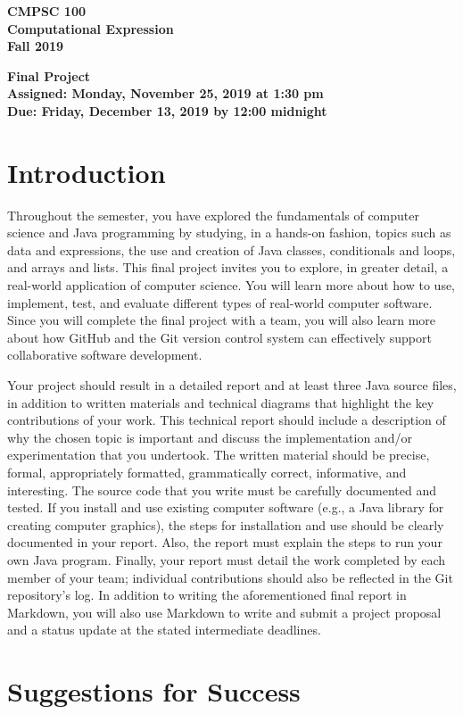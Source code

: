 \documentclass[11pt]{article}
\newcommand{\assignmentduedate}{December 13}
\newcommand{\assignmentassignedate}{November 25}
\newcommand{\labyear}{2019}
\newcommand{\labday}{Monday}
\newcommand{\labdueday}{Friday}
\newcommand{\labtime}{1:30 pm}
\newcommand{\labduetime}{12:00 midnight}
\newcommand{\assigneddate}{Assigned: \labday, \assignmentassignedate, \labyear{} at \labtime{}}
\newcommand{\duedate}{Due: \labdueday, \assignmentduedate, \labyear{} by \labduetime{}}
\newcommand{\labtitle}[1]
{
  \begin{center}
    \begin{center}
      \bf
      CMPSC 100\\Computational Expression\\
      Fall 2019\\
      \medskip
    \end{center}
    \bf
    #1
  \end{center}
}
\begin{document}
\thispagestyle{empty}

\labtitle{Final Project \\ \assigneddate{} \\ \duedate{}}

\section*{Introduction}

Throughout the semester, you have explored the fundamentals of computer science
and Java programming by studying, in a hands-on fashion, topics such as data and
expressions, the use and creation of Java classes, conditionals and loops, and
arrays and lists. This final project invites you to explore, in greater detail,
a real-world application of computer science. You will learn more about how to
use, implement, test, and evaluate different types of real-world computer
software. Since you will complete the final project with a team, you will also
learn more about how GitHub and the Git version control system can effectively
support collaborative software development.

Your project should result in a detailed report and at least three Java source
files, in addition to written materials and technical diagrams that highlight
the key contributions of your work. This technical report should include a
description of why the chosen topic is important and discuss the implementation
and/or experimentation that you undertook. The written material should be
precise, formal, appropriately formatted, grammatically correct, informative,
and interesting. The source code that you write must be carefully documented and
tested. If you install and use existing computer software (e.g., a Java library
for creating computer graphics), the steps for installation and use should be
clearly documented in your report. Also, the report must explain the steps to
run your own Java program. Finally, your report must detail the work completed
by each member of your team; individual contributions should also be reflected
in the Git repository's log. In addition to writing the aforementioned final
report in Markdown, you will also use Markdown to write and submit a project
proposal and a status update at the stated intermediate deadlines.

\section*{Suggestions for Success}
\end{document}
